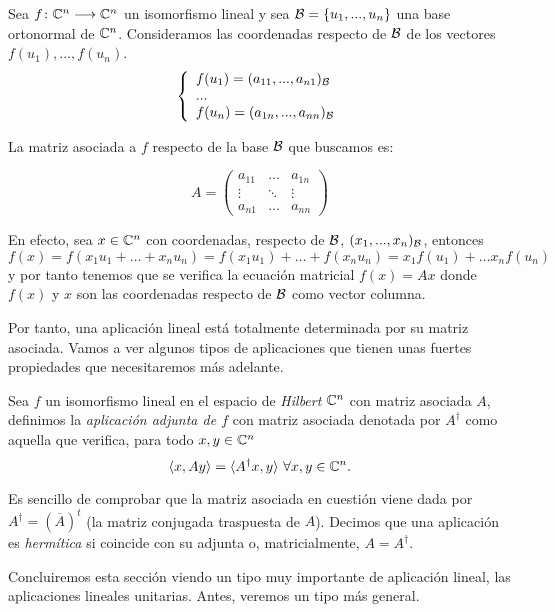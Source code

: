 Sea $f\colon \mathbb{C}^n\longrightarrow \mathbb{C}^n$ un isomorfismo lineal y sea $\mathcal{B}=\{u_1,...,u_n\}$ una base ortonormal de $\mathbb{C}^n$. Consideramos las coordenadas respecto de $\mathcal{B}$ de los vectores $f(u_1),...,f(u_n)$.
\[\left\{ \begin{array}{ll} f(u_1)=(a_{11},...,a_{n1})_{\mathcal{B}} \\...\\f(u_n)=(a_{1n},...,a_{nn})_{\mathcal{B}} \\ \end{array} \right.\]

La matriz asociada a $f$ respecto de la base $\mathcal{B}$ que buscamos es:

\[A=\left(\begin{matrix} a_{11}&\hdots&a_{1n}\\ \vdots&\ddots&\vdots\\ a_{n1}&\hdots&a_{nn} \end{matrix}\right)\]

En efecto, sea $x\in \mathbb{C}^n$ con coordenadas, respecto de $\mathcal{B}$, $(x_1,...,x_n)_{\mathcal{B}}$, entonces\newline $f(x)=f(x_1u_1+\hdots+x_nu_n)=f(x_1u_1)+\hdots+f(x_nu_n)=x_1f(u_1)+\hdots x_nf(u_n)$ y por tanto tenemos que se verifica la ecuación matricial $f(x)=Ax$ donde $f(x)$ y $x$ son las coordenadas respecto de $\mathcal{B}$ como vector columna.

Por tanto, una aplicación lineal está totalmente determinada por su matriz asociada. Vamos a ver algunos tipos de aplicaciones que tienen unas fuertes propiedades que necesitaremos más adelante.

\begin{definition} Sea $f$ un isomorfismo lineal en el espacio de \textit{Hilbert} $\mathbb{C}^n$ con matriz asociada $A$, definimos la \textit{aplicación adjunta de $f$} con matriz asociada denotada por $A^\dag$ como aquella que verifica, para todo $x,y\in\mathbb{C}^n$
\begin{equation}
\dotproduct{x}{Ay}=\dotproduct{A^\dag x}{y}\ \forall x,y\in\C^n.
\end{equation}

Es sencillo de comprobar que la matriz asociada en cuestión viene dada por $A^\dag=(\overline{A})^t$ (la matriz conjugada traspuesta de $A$). Decimos que una aplicación es \textit{hermítica} si coincide con su adjunta o, matricialmente, $A=A^\dag$.
\end{definition}

Concluiremos esta sección viendo un tipo muy importante de aplicación lineal, las aplicaciones lineales unitarias. Antes, veremos un tipo más general.

